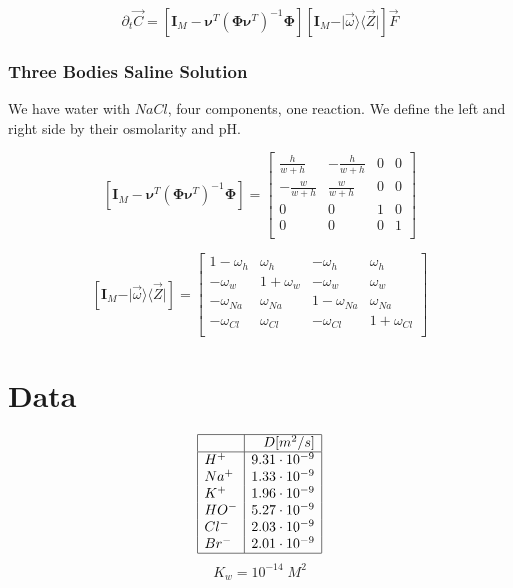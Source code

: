 \documentclass[aps,12pt]{revtex4}
\begin{document}
\begin{equation}
	\partial_t \vec C = \left[\bm{I}_M - \bm{\nu}^T (\bm \Phi \bm{\nu}^T) ^{-1} \bm \Phi \right] \left[\bm I_M - \vert\vec \omega \rangle \langle \vec Z \vert \right] \vec F
\end{equation}


\subsubsection{Three Bodies Saline Solution}

We have water with $NaCl$, four components, one reaction.
We define the left and right side by their osmolarity and pH.

\begin{equation}
\left[\bm{I}_M - \bm{\nu}^T (\bm \Phi \bm{\nu}^T) ^{-1} \bm \Phi \right]
=
\begin{bmatrix}
\frac{h}{w+h} & - \frac{h}{w+h} & 0 & 0\\
-\frac{w}{w+h} & \frac{w}{w+h}  & 0 & 0\\
0 & 0 & 1 & 0\\
0 & 0 & 0 & 1\\
\end{bmatrix}
\end{equation}

\begin{equation}
\left[\bm I_M - \vert\vec \omega \rangle \langle \vec Z \vert \right] =
\begin{bmatrix}
1-\omega_h & \omega_h & -\omega_h & \omega_h\\
-\omega_w  & 1+\omega_w & -\omega_w & \omega_w\\
-\omega_{Na}  & \omega_{Na} & 1-\omega_{Na} & \omega_{Na}\\
-\omega_{Cl}  & \omega_{Cl} & -\omega_{Cl} & 1+\omega_{Cl}\\
\end{bmatrix}
\end{equation}

\section{Data}

\begin{equation}
\begin{array}{|l|r|}
\hline
 \text{} & D[m^2/s]  \\
 \hline
 	H^+	 & 9.31\cdot10^{-9}	\\
 	Na^+ & 1.33\cdot10^{-9}	 \\
 	K^+	 & 1.96\cdot10^{-9}	 \\
 	HO^- & 5.27\cdot10^{-9}	 \\
 	Cl^- & 2.03\cdot10^{-9} \\
 	Br^- & 2.01\cdot10^{-9} \\
\hline
\end{array}
\end{equation}
$$
	K_w = 10^{-14}\; M^2
$$
\end{document}
